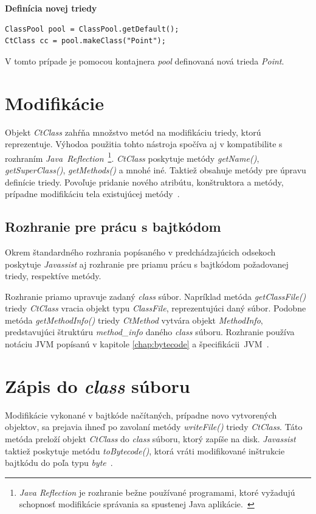 \documentclass[11pt,final,oneside]{fithesis}
\newenvironment{example}[1]
{
\vspace{3mm}
\noindent\textbf{#1}
\vspace{2mm}
}
{
\vspace{3mm}
}
\begin{document}
\begin{example}{Definícia novej triedy}
\begin{verbatim}
ClassPool pool = ClassPool.getDefault();
CtClass cc = pool.makeClass("Point");
\end{verbatim}
\end{example}

V tomto prípade je pomocou kontajnera \textit{pool} definovaná nová trieda
\textit{Point}. 

\section{Modifikácie}
\label{sec:mod}
Objekt \textit{CtClass} zahŕňa množstvo metód na modifikáciu triedy, ktorú 
reprezentuje. Výhodoa použitia tohto nástroja spočíva aj v kompatibilite s 
rozhraním \textit{Java~Reflection}~\footnote{\textit{Java Reflection} je 
rozhranie bežne používané programami, ktoré vyžadujú schopnosť modifikácie 
správania sa spustenej Java aplikácie.~\cite{Oracle:JavaReflection}}.
\textit{CtClass} poskytuje metódy \textit{getName()}, \textit{getSuperClass()},
\textit{getMethods()} a mnohé iné. Taktiež obsahuje metódy pre úpravu definície
triedy. Povoľuje pridanie nového atribútu, konštruktora a metódy, prípadne 
modifikáciu tela existujúcej metódy~\cite{Chiba:Javassist}.

\subsection{Rozhranie pre prácu s bajtkódom}
Okrem štandardného rozhrania popísaného v predchádzajúcich odsekoch poskytuje 
\textit{Javassist} aj rozhranie pre priamu prácu s bajtkódom požadovanej 
triedy, respektíve metódy.

Rozhranie priamo upravuje zadaný \textit{class} súbor. Napríklad metóda 
\textit{getClassFile()} triedy \textit{CtClass} vracia objekt typu 
\textit{ClassFile}, reprezentujúci daný súbor. Podobne metóda 
\textit{getMethodInfo()} triedy \textit{CtMethod} vytvára objekt 
\textit{MethodInfo}, predstavujúci štruktúru \textit{method\_info} daného 
\textit{class} súboru. Rozhranie používa notáciu JVM popísanú v kapitole 
\ref{chap:bytecode} a špecifikácii~JVM~\cite{Lindholm:2013:JVM:2462629}.

\section{Zápis do \textit{class} súboru}
Modifikácie vykonané v bajtkóde načítaných, prípadne novo vytvorených 
objektov, sa prejavia ihneď po zavolaní metódy \textit{writeFile()} triedy
\textit{CtClass}. Táto metóda preloží objekt \textit{CtClass} do \textit{class}
súboru, ktorý zapíše na disk. \textit{Javassist} taktiež poskytuje metódu 
\textit{toBytecode()}, ktorá vráti modifikované inštrukcie bajtkódu do poľa 
typu \textit{byte}~\cite{Chiba:Javassist}.
\end{document}
